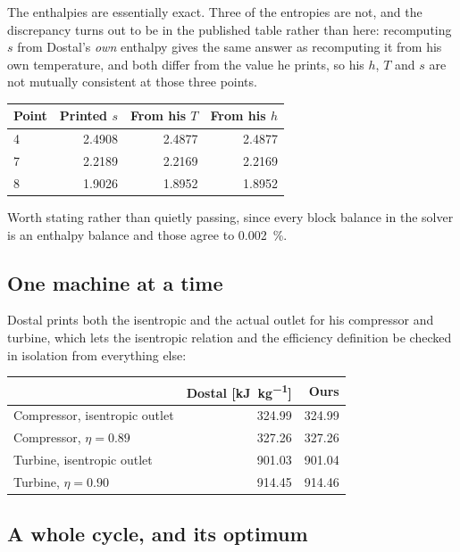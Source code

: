 \documentclass[11pt,a4paper]{report}
\begin{document}
The enthalpies are essentially exact. Three of the entropies are not, and
the discrepancy turns out to be in the published table rather than here:
recomputing $s$ from Dostal's \emph{own} enthalpy gives the same answer as
recomputing it from his own temperature, and both differ from the value he
prints, so his $h$, $T$ and $s$ are not mutually consistent at those three
points.

\begin{center}
\begin{tabular}{@{}lrrr@{}}
\toprule
Point & Printed $s$ & From his $T$ & From his $h$ \\
\midrule
4 & 2.4908 & 2.4877 & 2.4877 \\
7 & 2.2189 & 2.2169 & 2.2169 \\
8 & 1.9026 & 1.8952 & 1.8952 \\
\bottomrule
\end{tabular}
\end{center}

Worth stating rather than quietly passing, since every block balance in the
solver is an enthalpy balance and those agree to \SI{0.002}{\percent}.

\subsection{One machine at a time}

Dostal prints both the isentropic and the actual outlet for his compressor
and turbine, which lets the isentropic relation and the efficiency
definition be checked in isolation from everything else:

\begin{center}
\begin{tabular}{@{}lrr@{}}
\toprule
 & Dostal [\si{\kilo\joule\per\kilogram}] & Ours \\
\midrule
Compressor, isentropic outlet          &  324.99 &  324.99 \\
Compressor, $\eta = 0.89$              &  327.26 &  327.26 \\
Turbine, isentropic outlet             &  901.03 &  901.04 \\
Turbine, $\eta = 0.90$                 &  914.45 &  914.46 \\
\bottomrule
\end{tabular}
\end{center}

\subsection{A whole cycle, and its optimum}
\end{document}
